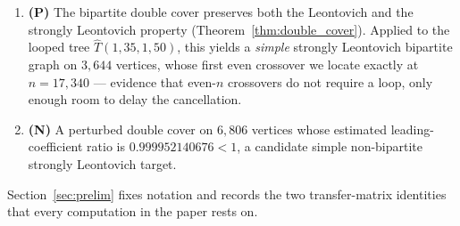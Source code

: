 \begin{enumerate}[label=(\roman*)]
  \item \textbf{(P)} The bipartite double cover preserves both the
    Leontovich and the strongly Leontovich property
    (Theorem~\ref{thm:double_cover}). Applied to the looped tree
    $\hat T(1,35,1,50)$, this yields a \emph{simple} strongly Leontovich
    bipartite graph on $3{,}644$ vertices, whose first even crossover we
    locate exactly at $n = 17{,}340$ --- evidence that even-$n$
    crossovers do not require a loop, only enough room to delay the
    cancellation.
  \item \textbf{(N)} A perturbed double cover on $6{,}806$ vertices whose
    estimated leading-coefficient ratio is $0.999952140676 < 1$,
    a candidate simple non-bipartite strongly Leontovich target.
\end{enumerate}

Section~\ref{sec:prelim} fixes notation and records the two
transfer-matrix identities that every computation in the paper rests on.
